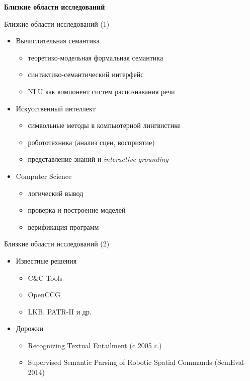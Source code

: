 \documentclass{beamer}
\begin{document}
\begin{frame}{}
\begin{center}
	\textbf{Близкие области исследований}\\
\end{center}
\end{frame}

\begin{frame}{Близкие области исследований (1)}
\begin{itemize}
	\item Вычислительная семантика
		\begin{itemize}
			\item теоретико-модельная формальная семантика
			\item синтактико-семантический интерфейс
			\item NLU как компонент систем распознавания речи
		\end{itemize}
	\bigskip
	\item Искусственный интеллект
		\begin{itemize}
			\item символьные методы в компьютерной лингвистике
			\item робототехника (анализ сцен, восприятие)
			\item представление знаний и \textit{interactive grounding}
		\end{itemize}
	\bigskip
	\item Computer Science
		\begin{itemize}
			\item логический вывод
			\item проверка и построение моделей
			\item верификация программ
		\end{itemize}
\end{itemize}
\end{frame}

\begin{frame}{Близкие области исследований (2)}
\begin{itemize}
	\item Известные решения
		\begin{itemize}
			\item C\&C Tools
			\item OpenCCG
			\item LKB, PATR-II и др.
		\end{itemize}
	\bigskip
	\item Дорожки
		\begin{itemize}
			\item Recognizing Textual Entailment (c 2005 г.)
			\item Supervised Semantic Parsing of Robotic Spatial Commands (SemEval-2014)
		\end{itemize}
\end{itemize}
\end{frame}
\end{document}
